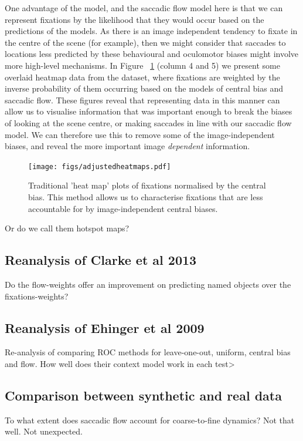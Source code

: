 One advantage of the \citep{clarke-tatler2014} model, and the saccadic flow model here is that we can represent fixations by the likelihood that they would occur based on the predictions of the models. As there is an image independent tendency to fixate in the centre of the scene (for example), then we might consider that saccades to locations less predicted by these behavioural and oculomotor biases might involve more high-level mechanisms. In Figure ~\ref{fig:adjustedHeatmaps} (column 4 and 5) we present some overlaid heatmap data from the \citep{clarke2013} dataset, where fixations are weighted by the inverse probability of them occurring based on the models of central bias and saccadic flow. These figures reveal that representing data in this manner can allow us to visualise information that was important enough to break the biases of looking at the scene centre, or making saccades in line with our saccadic flow model. We can therefore use this to remove some of the image-independent biases, and reveal the more important image \emph{dependent} information.

\begin{figure}
\texttt{[image: figs/adjustedheatmaps.pdf]}
\caption{Traditional 'heat map' plots of fixations normalised by the central bias. This method allows us to characterise fixations that are less accountable for by image-independent central biases.}
\label{fig:adjustedHeatmaps}
\end{figure}

Or do we call them hotspot maps?

\subsection{Reanalysis of Clarke et al 2013}

Do the flow-weights offer an improvement on predicting named objects over the fixations-weights?

\subsection{Reanalysis of Ehinger et al 2009}

Re-analysis of \cite{ehinger2009} comparing ROC methods for leave-one-out, uniform, central bias and flow. How well does their context model work in each test>

\subsection{Comparison between synthetic and real data}
\label{sec:humanComp}
To what extent does saccadic flow account for coarse-to-fine dynamics? Not that well. Not unexpected.

